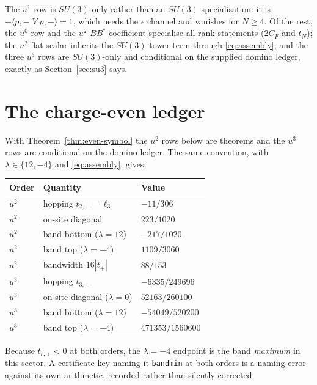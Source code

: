 \documentclass[11pt]{article}
\theoremstyle{plain}
\theoremstyle{definition}
\theoremstyle{remark}
\newcommand{\chk}[1]{}
\newcommand{\CF}{C_F}
\newcommand{\dg}{^{\dagger}}
\begin{document}
The $u^1$ row is $SU(3)$-only rather than an $SU(3)$ specialisation: it is
$-\langle p,-|V|p,-\rangle=1$, which needs the $\epsilon$ channel and vanishes
for $N\ge4$. Of the rest, the $u^0$ row and the $u^2$ $BB\dg$ coefficient
specialise all-rank statements ($2\CF$ and $t_N$); the $u^2$ flat scalar
inherits the $SU(3)$ tower term through \eqref{eq:assembly}; and the three
$u^3$ rows are $SU(3)$-only and conditional on the supplied domino ledger,
exactly as Section~\ref{sec:su3} says.

\section{The charge-even ledger}\label{app:even}

With Theorem~\ref{thm:even-symbol} the $u^2$ rows below are theorems and the
$u^3$ rows are conditional on the domino ledger. The same convention, with
$\lambda\in\{12,-4\}$ and \eqref{eq:assembly}, gives:

\begin{center}
\begin{tabular}{@{}lll@{}}
\toprule
Order & Quantity & Value\\
\midrule
$u^2$ & hopping $t_{2,+}=\ell_3$ & $-11/306$\\
$u^2$ & on-site diagonal & $223/1020$\\
$u^2$ & band bottom ($\lambda=12$) & $-217/1020$\\
$u^2$ & band top ($\lambda=-4$) & $1109/3060$\\
$u^2$ & bandwidth $16|t_+|$ & $88/153$\\
$u^3$ & hopping $t_{3,+}$ & $-6335/249696$\\
$u^3$ & on-site diagonal ($\lambda=0$) & $52163/260100$\\
$u^3$ & band bottom ($\lambda=12$) & $-54049/520200$\\
$u^3$ & band top ($\lambda=-4$) & $471353/1560600$\\
\bottomrule
\end{tabular}
\end{center}

\chk{one assembly formula gives every C-even value at both orders}

Because $t_{r,+}<0$ at both orders, the $\lambda=-4$ endpoint is the band
\emph{maximum} in this sector. A certificate key naming it \texttt{bandmin} at
both orders is a naming error against its own arithmetic, recorded rather than
silently corrected.
\chk{FINDING: the certificate key 'bandmin' holds the band MAXIMUM, at both orders}
\end{document}
